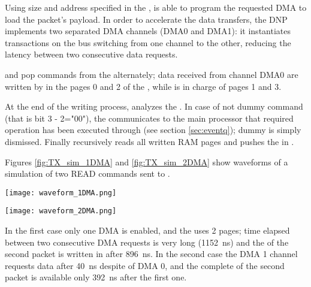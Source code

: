 Using size and address specified in the ,  is
able to program the requested DMA to load the packet's payload. In
order to accelerate the data transfers, the DNP implements two
separated DMA channels (DMA0 and DMA1): it instantiates transactions
on the \PCIe bus switching from one channel to the other, reducing the
latency between two consecutive data requests.

 and  pop commands from the  alternately; data received from channel DMA0 are written by
 in the pages 0 and 2 of the , while
 is in charge of pages 1 and 3.

At the end of the  writing process, 
analyzes the .
In case of not dummy command (that is  bit 3 - 2="00"), the
 communicates to the main processor that required
operation has been executed through  (see
section \ref{sec:eventq}); dummy  is simply dismissed.
Finally  recursively reads all written RAM pages and
pushes the \payload in .

Figures \ref{fig:TX_sim_1DMA} and \ref{fig:TX_sim_2DMA} show waveforms
of a simulation of two READ commands sent to \apenetp.
\begin{sidewaysfigure}
  \centering
  \texttt{[image: waveform\_1DMA.png]}
  \caption{\apenetp's CPU TX simulation with 1 DMA channel.
Time elapsed between two consecutive DMA requests is very long
(1152~ns) and the \payload of the second packet is written in  after 896~ns.}
  \label{fig:TX_sim_1DMA}
\end{sidewaysfigure}

\begin{sidewaysfigure}
  \centering
  \texttt{[image: waveform\_2DMA.png]}
  \caption{\apenetp's CPU TX simulation with 2 DMA channels.
The second request occurrs only 40~ns after the first one, 
and the complete \payload of the second packet is available 
only 392~ns after the first packet \payload.}
  \label{fig:TX_sim_2DMA}
\end{sidewaysfigure}

In the first case only one DMA is enabled, and the  uses 2
pages; time elapsed between two consecutive DMA requests is very long
(1152~ns) and the \payload of the second packet is written in  after 896~ns. In the second case the DMA 1 channel
requests data after 40~ns despite of DMA 0, and the complete \payload
of the second packet is available only 392~ns after the first one.

